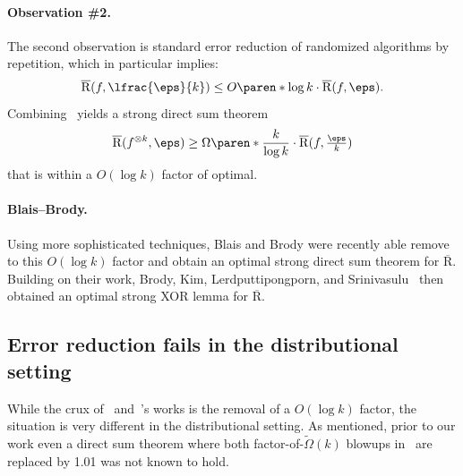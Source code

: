 \paragraph{Observation \#2.} The second observation is standard error reduction of randomized algorithms by repetition,  which in particular implies:  
\begin{equation} \overline{\mathrm{R}}(f, \lfrac{\eps}{k}) \leq O\paren*{\log k}\cdot \overline{\mathrm{R}}(f,\eps).\label{eq:success-amplification}
\end{equation} 
Combining~ yields a strong direct sum theorem
\begin{equation*}
    \overline{\mathrm{R}}(f^{\otimes k}, \eps) \geq \Omega\paren*{\frac{k}{\log k}} \cdot \overline{\mathrm{R}}(f,\tfrac{\eps}{k})\label{eq:easy}
\end{equation*}
that is within a $O(\log k)$ factor of optimal.  

\paragraph{Blais--Brody.} Using more sophisticated techniques, Blais and Brody \cite{BB19} were recently able remove to this $O(\log k)$ factor and obtain an optimal strong direct sum theorem for $\overline{\mathrm{R}}$. Building on their work, Brody, Kim, Lerdputtipongporn, and Srinivasulu~\cite{BKLS23} then obtained an optimal strong XOR lemma for $\overline{\mathrm{R}}$. 








\subsection{Error reduction fails in the distributional setting} 

While the crux of~\cite{BB19} and~\cite{BKLS23}'s works is the removal of a $O(\log k)$ factor, the situation is very different in the distributional setting. As mentioned, prior to our work even a direct sum theorem where both factor-of-$\tilde{\Omega}(k)$ blowups in~ are replaced by 1.01 was not known to hold. 


